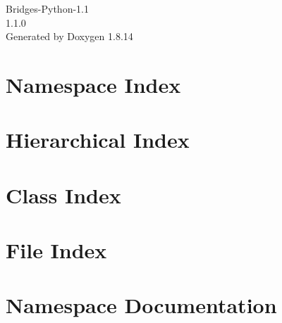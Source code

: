 \documentclass[twoside]{book}
\newcommand{\+}{\discretionary{\mbox{\scriptsize$\hookleftarrow$}}{}{}}
\newcommand{\clearemptydoublepage}{%
  \newpage{\pagestyle{empty}\cleardoublepage}%
}
\begin{document}
\hypersetup{pageanchor=false,
             bookmarksnumbered=true,
             pdfencoding=unicode
            }
\begin{titlepage}
\vspace*{7cm}
\begin{center}%
{\Large Bridges-\/\+Python-\/1.1 \\[1ex]\large 1.\+1.\+0 }\\
\vspace*{1cm}
{\large Generated by Doxygen 1.8.14}\\
\end{center}
\end{titlepage}
\clearemptydoublepage
{}
\tableofcontents
\clearemptydoublepage
{}
\hypersetup{pageanchor=true}

\chapter{Namespace Index}

\chapter{Hierarchical Index}

\chapter{Class Index}

\chapter{File Index}

\chapter{Namespace Documentation}























\end{document}
